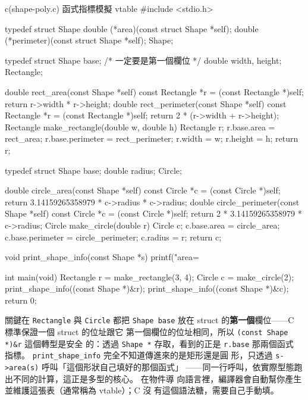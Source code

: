 \begin{example}{c}{(shape-poly.c) 函式指標模擬 vtable}
#include <stdio.h>

typedef struct Shape {
    double (*area)(const struct Shape *self);
    double (*perimeter)(const struct Shape *self);
} Shape;

typedef struct {
    Shape base; /* 一定要是第一個欄位 */
    double width, height;
} Rectangle;

double rect_area(const Shape *self) {
    const Rectangle *r = (const Rectangle *)self;
    return r->width * r->height;
}
double rect_perimeter(const Shape *self) {
    const Rectangle *r = (const Rectangle *)self;
    return 2 * (r->width + r->height);
}
Rectangle make_rectangle(double w, double h) {
    Rectangle r;
    r.base.area = rect_area;
    r.base.perimeter = rect_perimeter;
    r.width = w;
    r.height = h;
    return r;
}

typedef struct {
    Shape base;
    double radius;
} Circle;

double circle_area(const Shape *self) {
    const Circle *c = (const Circle *)self;
    return 3.14159265358979 * c->radius * c->radius;
}
double circle_perimeter(const Shape *self) {
    const Circle *c = (const Circle *)self;
    return 2 * 3.14159265358979 * c->radius;
}
Circle make_circle(double r) {
    Circle c;
    c.base.area = circle_area;
    c.base.perimeter = circle_perimeter;
    c.radius = r;
    return c;
}

void print_shape_info(const Shape *s) {
    printf("area=%
}

int main(void) {
    Rectangle r = make_rectangle(3, 4);
    Circle c = make_circle(2);
    print_shape_info((const Shape *)&r);
    print_shape_info((const Shape *)&c);
    return 0;
}
\end{example}


關鍵在 \texttt{Rectangle} 與 \texttt{Circle} 都把 \texttt{Shape base}
放在 struct 的\textbf{第一個}欄位——C 標準保證一個 struct 的位址跟它
第一個欄位的位址相同，所以 \texttt{(const Shape *)\&r} 這個轉型是安全
的：透過 \texttt{Shape *} 存取，看到的正是 \texttt{r.base} 那兩個函式
指標。 \texttt{print\_shape\_info} 完全不知道傳進來的是矩形還是圓
形，只透過 \texttt{s->area(s)} 呼叫「這個形狀自己填好的那個函式」
——同一行呼叫，依實際型態跑出不同的計算，這正是多型的核心。 在物件導
向語言裡，編譯器會自動幫你產生並維護這張表（通常稱為 vtable）；C 沒
有這個語法糖，需要自己手動填。

